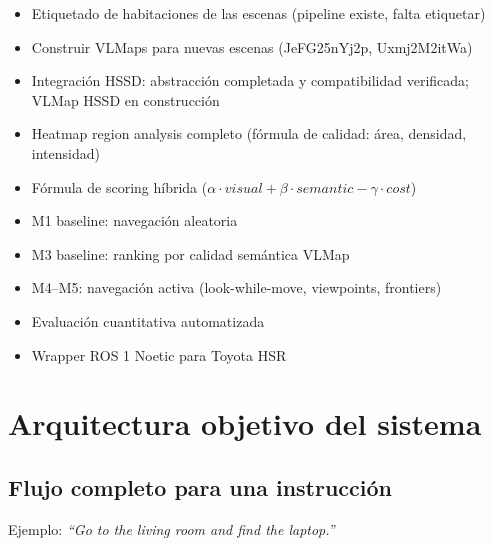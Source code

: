\documentclass[11pt,a4paper]{article}
\begin{document}
\begin{itemize}[leftmargin=2cm]
    \item[\textcolor{partial}{$\sim$}] Etiquetado de habitaciones de las escenas (pipeline existe, falta etiquetar)
    \item[\textcolor{partial}{$\sim$}] Construir VLMaps para nuevas escenas (JeFG25nYj2p, Uxmj2M2itWa)
    \item[\textcolor{partial}{$\sim$}] Integración HSSD: abstracción completada y compatibilidad verificada; VLMap HSSD en construcción
    \item[\textcolor{notdone}{$\times$}] Heatmap region analysis completo (fórmula de calidad: área, densidad, intensidad)
    \item[\textcolor{notdone}{$\times$}] Fórmula de scoring híbrida ($\alpha \cdot visual + \beta \cdot semantic - \gamma \cdot cost$)
    \item[\textcolor{notdone}{$\times$}] M1 baseline: navegación aleatoria
    \item[\textcolor{notdone}{$\times$}] M3 baseline: ranking por calidad semántica VLMap
    \item[\textcolor{notdone}{$\times$}] M4--M5: navegación activa (look-while-move, viewpoints, frontiers)
    \item[\textcolor{notdone}{$\times$}] Evaluación cuantitativa automatizada
    \item[\textcolor{notdone}{$\times$}] Wrapper ROS 1 Noetic para Toyota HSR
\end{itemize}

\section{Arquitectura objetivo del sistema}

\subsection{Flujo completo para una instrucción}

Ejemplo: \textit{``Go to the living room and find the laptop.''}
\end{document}
